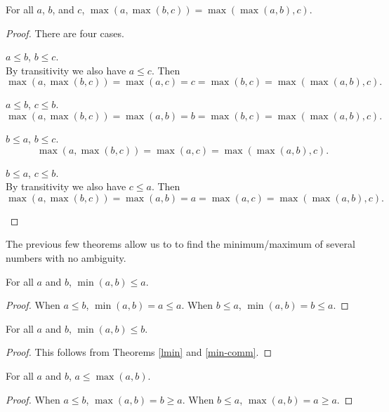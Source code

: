 \documentclass[../math.tex]{subfiles}
\begin{document}
\begin{theorem}
    For all $a$, $b$, and $c$, $\max(a, \max(b, c)) = \max(\max(a, b), c)$.
\end{theorem}
\begin{proof}
    There are four cases.
    \begin{case} $a \leq b$, $b \leq c$. \\
        By transitivity we also have $a \leq c$.  Then
        \[
            \max(a, \max(b, c)) = \max(a, c) =
            c
            = \max(b, c) = \max(\max(a, b), c).
        \]
    \end{case}
    \begin{case} $a \leq b$, $c \leq b$.
        \[
            \max(a, \max(b, c)) = \max(a, b) =
            b
            = \max(b, c) = \max(\max(a, b), c).
        \]
    \end{case}
    \begin{case} $b \leq a$, $b \leq c$.
        \[
            \max(a, \max(b, c)) =
            \max(a, c)
            = \max(\max(a, b), c).
        \]
    \end{case}
    \begin{case} $b \leq a$, $c \leq b$. \\
        By transitivity we also have $c \leq a$.  Then
        \[
            \max(a, \max(b, c)) = \max(a, b) =
            a
            = \max(a, c) = \max(\max(a, b), c).
        \]
    \end{case}
\end{proof}

The previous few theorems allow us to to find the minimum/maximum of several
numbers with no ambiguity.

\begin{theorem} \label{lmin}
    For all $a$ and $b$, $\min(a, b) \leq a$.
\end{theorem}
\begin{proof}
    When $a \leq b$, $\min(a, b) = a \leq a$.  When $b \leq a$, $\min(a, b) = b
    \leq a$.
\end{proof}

\begin{theorem} \label{rmin}
    For all $a$ and $b$, $\min(a, b) \leq b$.
\end{theorem}
\begin{proof}
    This follows from Theorems \ref{lmin} and \ref{min-comm}.
\end{proof}

\begin{theorem} \label{lmax}
    For all $a$ and $b$, $a \leq \max(a, b)$.
\end{theorem}
\begin{proof}
    When $a \leq b$, $\max(a, b) = b \geq a$.  When $b \leq a$, $\max(a, b) = a
    \geq a$.
\end{proof}
\end{document}
